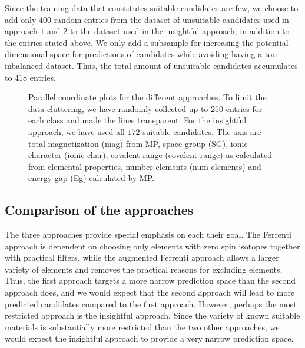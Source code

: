Since the training data that constitutes suitable candidates are few, we choose to add only $400$ random entries from the dataset of unsuitable candidates used in approach $1$ and $2$ to the dataset used in the insightful approach, in addition to the entries stated above. We only add a subsample for increasing the potential dimensional space for predictions of candidates while avoiding having a too inbalanced dataset. Thus, the total amount of unsuitable candidates accumulates to $418$ entries.

\clearpage

\begin{figure}[ht!]
    \centering
    \begin{subfigure}{1\textwidth}
        \centering
          
    \end{subfigure}
    \begin{subfigure}{1\textwidth}
        \centering
          
    \end{subfigure}
    \begin{subfigure}{1\textwidth}
        \centering
          
    \end{subfigure}
    \vspace*{-95mm}
    \caption{Parallel coordinate plots for the different approaches. To limit the data cluttering, we have randomly collected up to $250$ entries for each class and made the lines transparent. For the insightful approach, we have used all $172$ suitable candidates. The axis are total magnetization (mag) from MP, space group (SG), ionic character (ionic char), covalent range (covalent range) as calculated from elemental properties, number elements (num elements) and energy gap (Eg) calculated by MP.}
    \label{fig:parallel-coordinates-approaches}
\end{figure}

\clearpage


\subsection{Comparison of the approaches}

The three approaches provide special emphasis on each their goal. The Ferrenti approach is dependent on choosing only elements with zero spin isotopes together with practical filters, while the augmented Ferrenti approach allows a larger variety of elements and removes the practical reasons for excluding elements. Thus, the first approach targets a more narrow prediction space than the second approach does, and we would expect that the second approach will lead to more predicted candidates compared to the first approach. However, perhaps the most restricted approach is the insightful approach.
Since the variety of known suitable materials is substantially more restricted than the two other approaches, we would expect the insightful approach to provide a very narrow prediction space.

